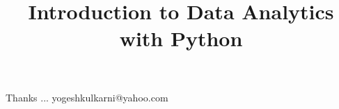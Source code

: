 \documentclass[xcolor=dvipsnames,compress,t,pdf,notes,9pt]{beamer}
\title[\insertframenumber /\inserttotalframenumber]{Introduction to Data Analytics with Python}
\begin{document}
	\begin{frame}
	\titlepage
	\end{frame}
	
%	
	
	
	\begin{frame}[c]{}
	Thanks ...
	\vspace{5mm}
	yogeshkulkarni@yahoo.com
	\end{frame}
\end{document}
